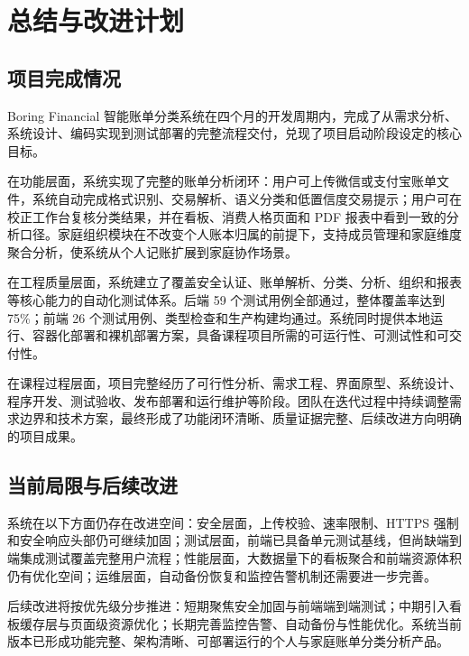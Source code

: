 \chapter{总结与改进计划}

\section{项目完成情况}

Boring Financial 智能账单分类系统在四个月的开发周期内，完成了从需求分析、系统设计、编码实现到测试部署的完整流程交付，兑现了项目启动阶段设定的核心目标。

在功能层面，系统实现了完整的账单分析闭环：用户可上传微信或支付宝账单文件，系统自动完成格式识别、交易解析、语义分类和低置信度交易提示；用户可在校正工作台复核分类结果，并在看板、消费人格页面和 PDF 报表中看到一致的分析口径。家庭组织模块在不改变个人账本归属的前提下，支持成员管理和家庭维度聚合分析，使系统从个人记账扩展到家庭协作场景。

在工程质量层面，系统建立了覆盖安全认证、账单解析、分类、分析、组织和报表等核心能力的自动化测试体系。后端 59 个测试用例全部通过，整体覆盖率达到 75\%；前端 26 个测试用例、类型检查和生产构建均通过。系统同时提供本地运行、容器化部署和裸机部署方案，具备课程项目所需的可运行性、可测试性和可交付性。

在课程过程层面，项目完整经历了可行性分析、需求工程、界面原型、系统设计、程序开发、测试验收、发布部署和运行维护等阶段。团队在迭代过程中持续调整需求边界和技术方案，最终形成了功能闭环清晰、质量证据完整、后续改进方向明确的项目成果。

\section{当前局限与后续改进}

系统在以下方面仍存在改进空间：安全层面，上传校验、速率限制、HTTPS 强制和安全响应头部仍可继续加固；测试层面，前端已具备单元测试基线，但尚缺端到端集成测试覆盖完整用户流程；性能层面，大数据量下的看板聚合和前端资源体积仍有优化空间；运维层面，自动备份恢复和监控告警机制还需要进一步完善。

\enlargethispage{2\baselineskip}
后续改进将按优先级分步推进：短期聚焦安全加固与前端端到端测试；中期引入看板缓存层与页面级资源优化；长期完善监控告警、自动备份与性能优化。系统当前版本已形成功能完整、架构清晰、可部署运行的个人与家庭账单分类分析产品。
